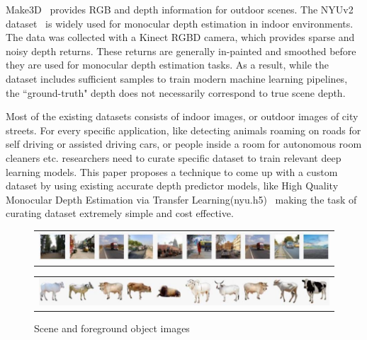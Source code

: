 \documentclass[review]{cvpr}
\begin{document}
Make3D~\cite{saxena2008make3d} provides RGB and depth information for outdoor scenes. The NYUv2 dataset~\cite{silberman2012indoor} is widely used for monocular depth estimation in indoor environments. The data was collected with a Kinect RGBD camera, which provides sparse and noisy depth returns. These returns are generally in-painted and smoothed before they are used for monocular depth estimation tasks. As a result, while the dataset includes sufficient samples to train modern machine learning pipelines, the ``ground-truth" depth does not necessarily correspond to true scene depth.

Most of the existing datasets consists of indoor images, or outdoor images of city streets. For every specific application, like detecting animals roaming on roads for self driving or assisted driving cars, or people inside a room for autonomous room cleaners etc. researchers need to curate specific dataset to train relevant deep learning models. This paper proposes a technique to come up with a custom dataset by using existing accurate depth predictor models, like High Quality Monocular Depth Estimation via Transfer Learning(nyu.h5)~\cite{alhashim2018high} making the task of curating dataset extremely simple and cost effective.

\begin{figure}
  \begin{center}
  \begin{tabular}{@{}c@{}}
    \includegraphics[width=1.0\linewidth]{bgimages.jpg}
  \end{tabular}
  \begin{tabular}{@{}c@{}}
      \includegraphics[width=1.0\linewidth]{fgimages.jpg}
  \end{tabular}
  \end{center}
  \caption{Scene and foreground object images}
  \label{fig:sceneandfg}
\end{figure}
\end{document}
